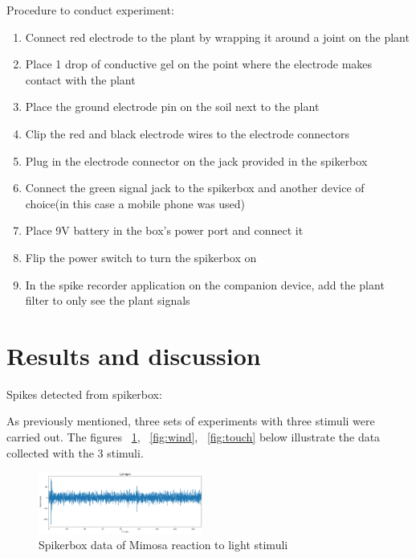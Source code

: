 \documentclass[conference]{IEEEtran}
\begin{document}
    Procedure to conduct experiment:
\begin{enumerate}
   \item  Connect red electrode to the plant by wrapping it around a joint on the plant
   \item  Place 1 drop of conductive gel on the point where the electrode makes contact with the plant
   \item  Place the ground electrode pin on the soil next to the plant
   \item  Clip the red and black electrode wires to the electrode connectors
   \item  Plug in the electrode connector on the jack provided in the spikerbox
   \item  Connect the green signal jack to the spikerbox and another device of choice(in this case a mobile phone was used)
   \item  Place 9V battery in the box’s power port and connect it
   \item  Flip the power switch to turn the spikerbox on
   \item  In the spike recorder application on the companion device, add the plant filter to only see the plant signals
\end{enumerate}

\section{Results and discussion}

Spikes detected from spikerbox:

As previously mentioned, three sets of experiments with three stimuli 
were carried out. The figures ~\ref{fig:light}, ~\ref{fig:wind}, ~\ref{fig:touch} 
below illustrate the data collected with the 3 stimuli.

\begin{figure}[H]
    \begin{center}
        \includegraphics[width=0.48\textwidth]{light}
    \end{center}
    \vspace{-\baselineskip}
    \caption{Spikerbox data of Mimosa reaction to light stimuli}\label{fig:light}
\end{figure}
\end{document}
